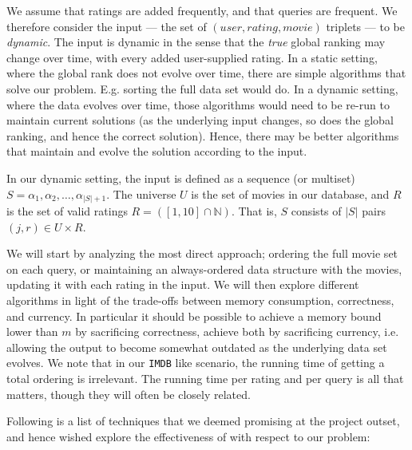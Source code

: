 \documentclass[a4paper, titlepage]{article}
\renewcommand{\%}{\scalebox{.9}{\oldpct}}
\begin{document}
We assume that ratings are added frequently, and that queries are frequent. We
therefore consider the input --- the set of $(user, rating, movie)$ triplets ---
to be \textit{dynamic}. The input is dynamic in the sense that the \textit{true}
global ranking may change over time, with every added user-supplied rating. In a
static setting, where the global rank does not evolve over time, there are
simple algorithms that solve our problem. E.g. sorting the full data set would
do.
In a dynamic setting, where the data evolves over time,
those algorithms would need to be re-run to maintain current solutions (as the
underlying input changes, so does the global ranking, and hence the correct
solution). Hence, there may be better algorithms that maintain and evolve the
solution according to the input.

In our dynamic setting, the input is defined as a sequence (or multiset) $S =
\alpha_1, \alpha_2,\ldots,\alpha_{|S|+1}$. The universe $U$ is the set of movies
in our database, and $R$ is the set of valid ratings $R =
\left(\left[1,10\right]\cap \mathbb{N}\right)$. That is, $S$ consists of $|S|$
pairs $(j,r)\in U \times R$.

We will start by analyzing the most direct approach; ordering the full movie set
on each query, or maintaining an always-ordered data structure with the movies,
updating it with each rating in the input. We will then explore different
algorithms in light of the trade-offs between memory consumption, correctness,
and currency. In particular it should be possible to achieve a memory bound
lower than $m$ by sacrificing correctness, achieve both by sacrificing currency,
i.e. allowing the output to become somewhat outdated as the underlying data set
evolves. We note that in our \texttt{IMDB} like scenario, the running time of
getting a total ordering is irrelevant. The running time per rating and per
query is all that matters, though they will often be closely related.





Following is a list of techniques that we deemed promising at the project
outset, and hence wished explore the effectiveness of with respect to our
problem:
\end{document}
